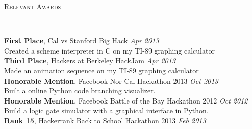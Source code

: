 \documentclass[9pt]{article}
\newenvironment{changemargin}[2]{%
  \begin{list}{}{%
      \setlength{\topsep}{0pt}%
      \setlength{\leftmargin}{#1}%
      \setlength{\rightmargin}{#2}%
      \setlength{\listparindent}{\parindent}%
      \setlength{\itemindent}{\parindent}%
      \setlength{\parsep}{\parskip}%
    }%
  \item[]}{\end{list}
}
\newcommand{\lineover}{
  \begin{changemargin}{-0.05in}{-0.05in}
    \vspace*{-8pt}
    \hrulefill \\
    \vspace*{-2pt}
  \end{changemargin}
}
\newcommand{\header}[1]{
  \begin{changemargin}{-0.5in}{-0.5in}
    \scshape{#1}\\
    \lineover
  \end{changemargin}
}
\newenvironment{body} {
  \vspace*{-16pt}
  \begin{changemargin}{-0.25in}{-0.5in}
  }
  {\end{changemargin}
}
\begin{document}
\begin{body}

\end{body}

\smallskip


\header{Relevant Awards}

\begin{body}
  \vspace{14pt}
  \textbf{First Place}, Cal vs Stanford Big Hack \hfill{} \emph{Apr 2013}\\
  Created a scheme interpreter in C on my TI-89 graphing calculator \\
  \textbf{Third Place}, Hackers at Berkeley HackJam \hfill{} \emph{Apr 2013}\\
  Made an animation sequence on my TI-89 graphing calculator \\
  \textbf{Honorable Mention}, Facebook Nor-Cal Hackathon 2013 \hfill{} \emph{Oct 2013}\\
  Built a online Python code branching visualizer.\\
  \textbf{Honorable Mention}, Facebook Battle of the Bay Hackathon 2012 \hfill{} \emph{Oct 2012}\\
  Build a logic gate simulator with a graphical interface in Python. \\
  \textbf{Rank 15}, Hackerrank Back to School Hackathon 2013 \hfill{} \emph{Feb 2013}\\
\end{body}
\end{document}
